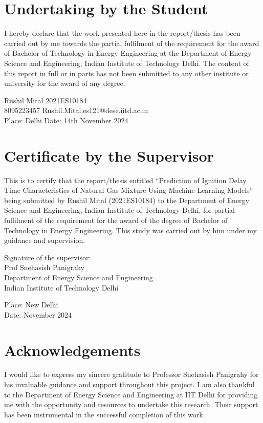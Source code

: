 \documentclass[12pt]{report}
\begin{document}
\newpage

\section*{ \centering Undertaking by the Student}
I hereby declare that the work presented here in the report/thesis has been carried out by me towards the partial fulfilment of the requirement for the award of Bachelor of Technology in Energy Engineering at the Department of Energy Science and Engineering, Indian Institute of Technology Delhi. The content of this report in full or in parts has not been submitted to any other institute or university for the award of any degree.
\vspace{2cm}


Rushil Mital \hfill 2021ES10184 \\
8095223457 \hfill Rushil.Mital.es121@dese.iitd.ac.in \\
Place: Delhi \hfill Date: 14th November 2024

\newpage

\section*{\centering Certificate by the Supervisor}
This is to certify that the report/thesis entitled “Prediction of Ignition Delay Time Characteristics of Natural Gas Mixture Using Machine Learning Models” being submitted by Rushil Mital (2021ES10184) to the Department of Energy Science and Engineering, Indian Institute of Technology Delhi, for partial fulfilment of the requirement for the award of the degree of Bachelor of Technology in Energy Engineering. This study was carried out by him under my guidance and supervision.

\vspace{1cm}

\begin{flushright}
Signature of the supervisor: \\
Prof Snehasish Panigrahy \\
Department of Energy Science and Engineering \\
Indian Institute of Technology Delhi
\end{flushright}

Place: New Delhi \\
Date: November 2024\\



\newpage
\section*{\centering Acknowledgements}
I would like to express my sincere gratitude to Professor Snehasish Panigrahy for his invaluable guidance and support throughout this project. I am also thankful to the Department of Energy Science and Engineering at IIT Delhi for providing me with the opportunity and resources to undertake this research. Their support has been instrumental in the successful completion of this work.
\end{document}
